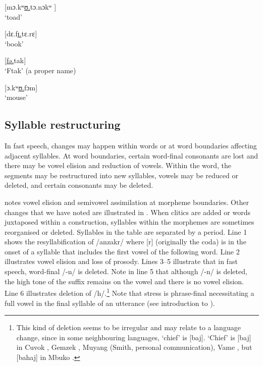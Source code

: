 \ea \label{ex:2:60}
\textup{[}\textup{mɔ.kʷ}\underline{\textup{ʊ.}}\textup{tɔ.nɔkʷ}\textup{ ]}\\
\glt  ‘toad’
\z

\ea \label{ex:2:61}
\textup{[dɛ.f}\underline{\textup{ɪ.}}\textup{tɛ.rɛ}\textup{]}\\
\glt  ‘book’
\z

\ea \label{ex:2:62}
\textup{[}\underline{\textup{fə.}}\textup{tak}\textup{]}\\
\glt  ‘Ftak’ (a proper name)
\z

\ea \label{ex:2:63}
[ɔ.kʷ\underline{ʊ.}fɔm]\\
\glt  ‘mouse’
\z

\subsection{Syllable restructuring}\label{sec:2.5.2}
\hypertarget{RefHeading1210721525720847}{}
In fast speech, changes may happen within words or at word boundaries affecting adjacent syllables. At word boundaries, certain word-final consonants are lost and there may be vowel elision and reduction of vowels. Within the word, the segments may be restructured into new syllables, vowels may be reduced or deleted, and certain consonants may be deleted.

\citet{Bow1997c} notes vowel elision and semivowel assimilation at morpheme boundaries. Other changes that we have noted are illustrated in . When clitics are added or words juxtaposed within a construction, syllables within the morphemes are sometimes reorganised or deleted. Syllables in the table are separated by a period. Line 1 shows the resyllabification of /anzakr/ where [r] (originally the coda) is in the onset of a syllable that includes the first vowel of the following word. Line 2 illustrates vowel elision and loss of prosody. Lines 3--5 illustrate that in fast speech, word-final /-n/ is deleted. Note in line 5 that although /-n/ is deleted, the high tone of the suffix remains on the vowel and there is no vowel elision. Line 6 illustrates deletion of /h/.\footnote{This kind of deletion seems to be irregular and may relate to a language change, since in some neighbouring languages, ‘chief’ is [baj]. ‘Chief' is [baj] in Cuvok \citep[120]{Ndokobai2006}, Gemzek \citep[9]{Gravina2005}, Muyang (Smith, personal communication), Vame \citep[17]{Kinnaird2006}, but [bahaj] in Mbuko \citep[9]{Gravina2001}.} Note that stress is phrase-final necessitating a full vowel in the final syllable of an utterance (see introduction to ).


